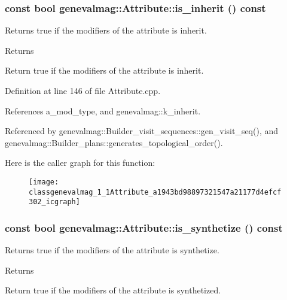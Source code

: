 \hypertarget{classgenevalmag_1_1Attribute_a1943bd98897321547a21177d4efcf302}{
\subsubsection[{is\_\-inherit}]{\setlength{\rightskip}{0pt plus 5cm}const bool genevalmag::Attribute::is\_\-inherit () const}}
\label{classgenevalmag_1_1Attribute_a1943bd98897321547a21177d4efcf302}
Returns true if the modifiers of the attribute is inherit. \begin{DoxyReturn}{Returns}

\end{DoxyReturn}
Return true if the modifiers of the attribute is inherit. 

Definition at line 146 of file Attribute.cpp.



References a\_\-mod\_\-type, and genevalmag::k\_\-inherit.



Referenced by genevalmag::Builder\_\-visit\_\-sequences::gen\_\-visit\_\-seq(), and genevalmag::Builder\_\-plans::generates\_\-topological\_\-order().



Here is the caller graph for this function:\nopagebreak
\begin{figure}[H]
\begin{center}
\leavevmode
\texttt{[image: classgenevalmag\_1\_1Attribute\_a1943bd98897321547a21177d4efcf302\_icgraph]}
\end{center}
\end{figure}


\hypertarget{classgenevalmag_1_1Attribute_aadba4924920a427077f71234c9beb3b5}{
\subsubsection[{is\_\-synthetize}]{\setlength{\rightskip}{0pt plus 5cm}const bool genevalmag::Attribute::is\_\-synthetize () const}}
\label{classgenevalmag_1_1Attribute_aadba4924920a427077f71234c9beb3b5}
Returns true if the modifiers of the attribute is synthetize. \begin{DoxyReturn}{Returns}

\end{DoxyReturn}
Return true if the modifiers of the attribute is synthetized. 

